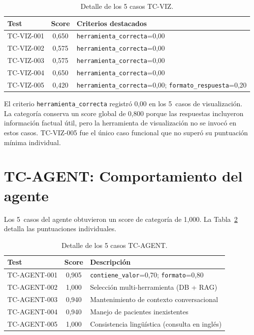 \begin{table}[H]
\centering
\caption{Detalle de los 5 casos TC-VIZ.}
\label{tab:res_tc_viz}
\footnotesize
\begin{tabularx}{\columnwidth}{lcX}
\toprule
\textbf{Test} & \textbf{Score} & \textbf{Criterios destacados} \\
\midrule
TC-VIZ-001 & 0,650 & \texttt{herramienta\_correcta}=0,00 \\
TC-VIZ-002 & 0,575 & \texttt{herramienta\_correcta}=0,00 \\
TC-VIZ-003 & 0,575 & \texttt{herramienta\_correcta}=0,00 \\
TC-VIZ-004 & 0,650 & \texttt{herramienta\_correcta}=0,00 \\
TC-VIZ-005 & 0,420 & \texttt{herramienta\_correcta}=0,00; \texttt{formato\_respuesta}=0,20 \\
\bottomrule
\end{tabularx}
\end{table}

El criterio \texttt{herramienta\_correcta} registró 0,00 en los 5~casos de visualización. La categoría conserva un score global de 0,800 porque las respuestas incluyeron información factual útil, pero la herramienta de visualización no se invocó en estos casos. TC-VIZ-005 fue el único caso funcional que no superó su puntuación mínima individual.

\section{TC-AGENT: Comportamiento del agente}

Los 5~casos del agente obtuvieron un score de categoría de 1,000. La Tabla~\ref{tab:res_tc_agent} detalla las puntuaciones individuales.

\begin{table}[H]
\centering
\caption{Detalle de los 5 casos TC-AGENT.}
\label{tab:res_tc_agent}
\footnotesize
\begin{tabularx}{\columnwidth}{lcX}
\toprule
\textbf{Test} & \textbf{Score} & \textbf{Descripción} \\
\midrule
TC-AGENT-001 & 0,905 & \texttt{contiene\_valor}=0,70; \texttt{formato}=0,80 \\
TC-AGENT-002 & 1,000 & Selección multi-herramienta (DB + \ac{RAG}) \\
TC-AGENT-003 & 0,940 & Mantenimiento de contexto conversacional \\
TC-AGENT-004 & 0,940 & Manejo de pacientes inexistentes \\
TC-AGENT-005 & 1,000 & Consistencia lingüística (consulta en inglés) \\
\bottomrule
\end{tabularx}
\end{table}



